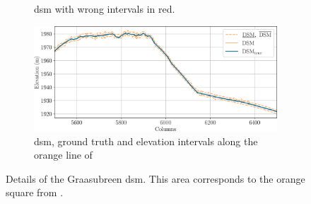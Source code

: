 \begin{figure}
\begin{subfigure}[t]{0.49\linewidth}
        \caption{\acrshort{dsm} with wrong intervals in red.}
        \label{fig:Graasubreen_error_zoom}
    \end{subfigure}
    \begin{subfigure}[t]{\linewidth}
        \centering
        \includegraphics[width=\linewidth]{Images/Chap_6/Graasubreen_row_1500.png}
        \caption{\acrshort{dsm}, ground truth and elevation intervals along the orange line of }
        \label{fig:Graasubreen_zoom_row}
    \end{subfigure}
    \caption{Details of the Graasubreen \acrshort{dsm}. This area corresponds to the orange square from .}
    \label{fig:Graasubreen_zoom}
\end{figure}


